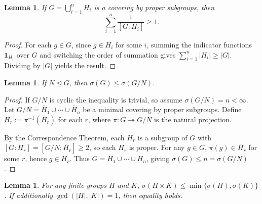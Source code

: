 \documentclass[12pt, a4paper]{article}
\theoremstyle{plain}
\newtheorem{lemma}[theorem]{Lemma}
\theoremstyle{definition}
\begin{document}
\begin{lemma}
  \label{lem:sum}
  If $G = \bigcup_{i=1}^n H_i$ is a covering by proper subgroups, then
  \[
    \sum_{i=1}^{n} \frac{1}{[G:H_i]} \geq 1.
  \]
\end{lemma}

\begin{proof}
  For each $g \in G$, since $g \in H_i$ for some $i$, summing the indicator
  functions $\mathbf{1}_{H_i}$ over $G$ and switching the order of summation gives
  $\sum_{i=1}^n |H_i| \geq |G|$. Dividing by $|G|$ yields the result.
\end{proof}


\begin{lemma}
\label{lem:quotient}
If $N \trianglelefteq G$, then $\sigma(G) \leq \sigma(G/N)$.
\end{lemma}

\begin{proof}
If $G/N$ is cyclic the inequality is trivial, so assume $\sigma(G/N) = n < \infty$.
Let $G/N = \bar{H}_1 \cup \cdots \cup \bar{H}_n$ be a minimal covering by proper
subgroups. Define $H_r := \pi^{-1}(\bar{H}_r)$ for each $r$, where
$\pi : G \twoheadrightarrow G/N$ is the natural projection.

By the Correspondence Theorem, each $H_r$ is a subgroup of $G$ with
$[G : H_r] = [G/N : \bar{H}_r] \geq 2$, so each $H_r$ is proper.
For any $g \in G$, $\pi(g) \in \bar{H}_r$ for some $r$, hence $g \in H_r$.
Thus $G = H_1 \cup \cdots \cup H_n$, giving $\sigma(G) \leq n = \sigma(G/N)$.
\end{proof}

\begin{lemma}
\label{lem:coprime}
For any finite groups $H$ and $K$,
$\sigma(H \times K) \leq \min\{\sigma(H), \sigma(K)\}$.
If additionally $\gcd(|H|, |K|) = 1$, then equality holds.
\end{lemma}
\end{document}
